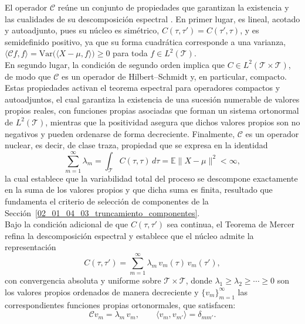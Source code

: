 El operador $\mathcal{C}$ reúne un conjunto de propiedades que garantizan la existencia y las cualidades de su descomposición espectral \citep{02_02_hsing2015theoretical}. En primer lugar, es lineal, acotado y autoadjunto, pues su núcleo es simétrico, $C(\tau,\tau') = C(\tau',\tau)$, y es semidefinido positivo, ya que su forma cuadrática corresponde a una varianza, $\langle \mathcal{C}f, f\rangle = \mathrm{Var}\bigl(\langle X - \mu, f\rangle\bigr) \geq 0$ para toda $f \in L^2(\mathcal{T})$.\\

En segundo lugar, la condición de segundo orden implica que $C \in L^2(\mathcal{T}\times\mathcal{T})$, de modo que $\mathcal{C}$ es un operador de Hilbert--Schmidt y, en particular, compacto. Estas propiedades activan el teorema espectral para operadores compactos y autoadjuntos, el cual garantiza la existencia de una sucesión numerable de valores propios reales, con funciones propias asociadas que forman un sistema ortonormal de $L^2(\mathcal{T})$, mientras que la positividad asegura que dichos valores propios son no negativos y pueden ordenarse de forma decreciente. Finalmente, $\mathcal{C}$ es un operador nuclear, es decir, de clase traza, propiedad que se expresa en la identidad
\begin{equation}\label{eq:traza}
    \sum_{m=1}^{\infty} \lambda_m
    = \int_{\mathcal{T}} C(\tau, \tau)\, d\tau
    = \mathbb{E}\|X - \mu\|^2 < \infty,
\end{equation}
la cual establece que la variabilidad total del proceso se descompone exactamente en la suma de los valores propios y que dicha suma es finita, resultado que fundamenta el criterio de selección de componentes de la Sección~\ref{02_01_04_03_truncamiento_componentes}.\\

Bajo la condición adicional de que $C(\tau, \tau')$ sea continua, el Teorema de Mercer \citep{02_01_mercer1909functions} refina la descomposición espectral y establece que el núcleo admite la representación
\begin{equation}\label{eq:mercer}
    C(\tau, \tau') = \sum_{m=1}^{\infty} \lambda_m\, v_m(\tau)\, v_m(\tau'),
\end{equation}
con convergencia absoluta y uniforme sobre $\mathcal{T}\times\mathcal{T}$, donde $\lambda_1 \geq \lambda_2 \geq \cdots \geq 0$ son los valores propios ordenados de manera decreciente y $\{v_m\}_{m=1}^{\infty}$ las correspondientes funciones propias ortonormales, que satisfacen:
\begin{equation}
    \mathcal{C}v_m = \lambda_m\, v_m,
    \qquad \langle v_m, v_{m'} \rangle = \delta_{mm'}.
\end{equation}

